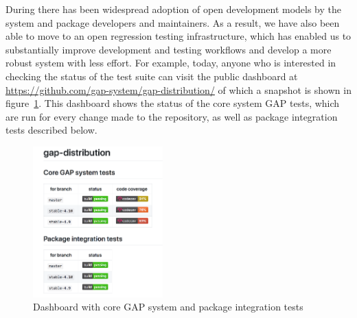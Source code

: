 
%
%

During \ODK there has been widespread adoption of open development models by the
\GAP system and package developers and
maintainers. As a result, we have also been able to move
to an open regression testing infrastructure, which has enabled us
to substantially improve \GAP development and testing workflows and
develop a more robust system with less effort. For example,
today, anyone who is interested in checking the
status of the \GAP test suite can visit the public dashboard at
\url{https://github.com/gap-system/gap-distribution/} of which a
snapshot is shown in figure~\ref{fig:gap-core-tests}.
This dashboard shows the status of the core system GAP tests,
which are run for every change made to the repository, as well as
package integration tests described below.

\begin{figure}[!ht]
    \begin{mdframed}
    \centering
    \includegraphics[width=5cm]{images/gap-core-tests}
    \end{mdframed}
    \caption{Dashboard with core GAP system and package integration tests}
    \label{fig:gap-core-tests}
\end{figure}


